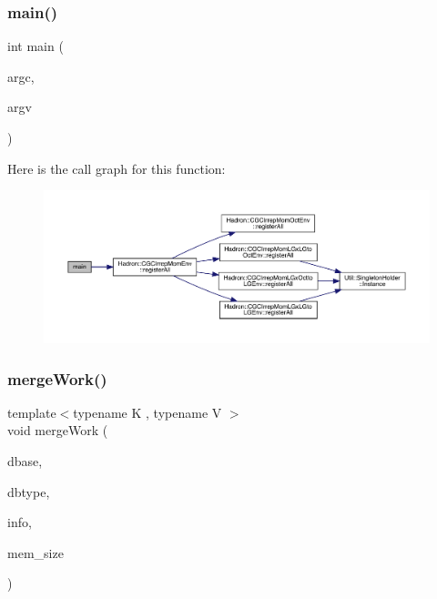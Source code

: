 \subsubsection{\texorpdfstring{main()}{main()}}
{\footnotesize\ttfamily int main (\begin{DoxyParamCaption}\item[{int}]{argc,  }\item[{char $\ast$$\ast$}]{argv }\end{DoxyParamCaption})}

Here is the call graph for this function\+:
\nopagebreak
\begin{figure}[H]
\begin{center}
\leavevmode
\includegraphics[width=350pt]{db/d3c/adat-devel_2main_2dbutil_2dbmerge_8cc_a3c04138a5bfe5d72780bb7e82a18e627_cgraph}
\end{center}
\end{figure}
\mbox{\label{adat-devel_2main_2dbutil_2dbmerge_8cc_a6c8a139a4e0f3c2eb65b1a9828dc910a}} 
\subsubsection{\texorpdfstring{mergeWork()}{mergeWork()}}
{\footnotesize\ttfamily template$<$typename K , typename V $>$ \\
void merge\+Work (\begin{DoxyParamCaption}\item[{const string \&}]{dbase,  }\item[{const string \&}]{dbtype,  }\item[{const std\+::vector$<$ \mbox{\hyperlink{classFILEDB_1_1ConfigInfo}{Config\+Info}} $>$ \&}]{info,  }\item[{unsigned int}]{mem\+\_\+size }\end{DoxyParamCaption})}



